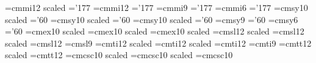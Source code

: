 \font\fourteeni   =cmmi12 scaled     \skewchar\fourteeni='177
\font\twelvei     =cmmi12                       \skewchar\twelvei='177
\font\ninei       =cmmi9                          \skewchar\ninei='177
\font\sixi        =cmmi6                           \skewchar\sixi='177
%
\font\seventeensy =cmsy10 scaled    \skewchar\seventeensy='60
\font\fourteensy  =cmsy10 scaled     \skewchar\fourteensy='60
\font\twelvesy    =cmsy10 scaled       \skewchar\twelvesy='60
\font\ninesy      =cmsy9                          \skewchar\ninesy='60
\font\sixsy       =cmsy6                           \skewchar\sixsy='60
%
\font\seventeenex =cmex10 scaled
\font\fourteenex  =cmex10 scaled
\font\twelveex    =cmex10 scaled
%
\font\seventeensl =cmsl12 scaled
\font\fourteensl  =cmsl12 scaled
\font\twelvesl    =cmsl12
\font\ninesl      =cmsl9
%
\font\seventeenit =cmti12 scaled
\font\fourteenit  =cmti12 scaled
\font\twelveit    =cmti12
\font\nineit      =cmti9
%
\font\fourteentt  =cmtt12 scaled
\font\twelvett    =cmtt12
%
\font\fourteencp  =cmcsc10 scaled
\font\twelvecp    =cmcsc10 scaled
\font\tencp       =cmcsc10
%
%
\def\fourteenf@nts{\relax
    \textfont0=\fourteenrm          \scriptfont0=\tenrm
      \scriptscriptfont0=\sevenrm
    \textfont1=\fourteeni           \scriptfont1=\teni
      \scriptscriptfont1=\seveni
    \textfont2=\fourteensy          \scriptfont2=\tensy
      \scriptscriptfont2=\sevensy
    \textfont3=\fourteenex          \scriptfont3=\twelveex
      \scriptscriptfont3=\tenex
    \textfont\itfam=\fourteenit     \scriptfont\itfam=\tenit
    \textfont\slfam=\fourteensl     \scriptfont\slfam=\tensl
    \textfont\bffam=\fourteenbf     \scriptfont\bffam=\tenbf
      \scriptscriptfont\bffam=\sevenbf
    \textfont\ttfam=\fourteentt
    \textfont\cpfam=\fourteencp }
%
\def\twelvef@nts{\relax
    \textfont0=\twelverm          \scriptfont0=\ninerm
      \scriptscriptfont0=\sixrm
    \textfont1=\twelvei           \scriptfont1=\ninei
      \scriptscriptfont1=\sixi
    \textfont2=\twelvesy           \scriptfont2=\ninesy
      \scriptscriptfont2=\sixsy
    \textfont3=\twelveex          \scriptfont3=\tenex
      \scriptscriptfont3=\tenex
    \textfont\itfam=\twelveit     \scriptfont\itfam=\nineit
    \textfont\slfam=\twelvesl     \scriptfont\slfam=\ninesl
    \textfont\bffam=\twelvebf     \scriptfont\bffam=\ninebf
      \scriptscriptfont\bffam=\sixbf
    \textfont\ttfam=\twelvett
    \textfont\cpfam=\twelvecp }
